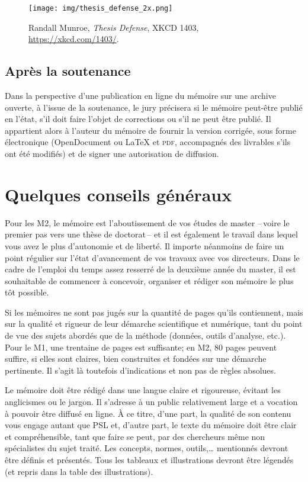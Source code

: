 \documentclass[a4paper,twoside,12pt]{book}
\begin{document}
\begin{figure}
\centering %
\texttt{[image: img/thesis\_defense\_2x.png]}
\caption{Randall Munroe, \textit{Thesis Defense}, XKCD 1403, \url{https://xkcd.com/1403/}.}
\end{figure}


\subsection{Après la soutenance}

Dans la perspective d'une publication en ligne du mémoire sur une archive ouverte, à l'issue de la soutenance, le jury précisera si le mémoire peut-être publié en l'état, s'il doit faire l'objet de corrections ou s'il ne peut être publié. Il appartient alors à l'auteur du mémoire 
de fournir la version corrigée, sous forme électronique (OpenDocument ou \LaTeX{} et \textsc{pdf}, accompagnés des livrables s'ils ont été modifiés) et de signer une autorisation de diffusion.

\section{Quelques conseils généraux}

Pour les M2, le mémoire est l'aboutissement de vos études de master --\,voire le premier pas vers une thèse de doctorat\,-- et il est également le travail dans lequel vous avez le plus d'autonomie et de liberté. 
Il importe néanmoins de faire un point régulier sur l'état d'avancement de vos travaux avec vos directeurs. Dans le cadre de l'emploi du temps assez resserré de la deuxième année du master, il est souhaitable
de commencer à concevoir, organiser et rédiger son mémoire le plus tôt possible.


Si les mémoires ne sont pas jugés sur la quantité de pages qu'ils contiennent, mais sur la qualité et rigueur de leur démarche scientifique et numérique, tant du point de vue des sujets abordés que de la méthode (données, outils d'analyse, etc.). Pour le M1, une trentaine de pages est suffisante; en M2, 80 pages peuvent suffire, si elles sont claires, bien construites et fondées sur une démarche pertinente.
Il s'agit là toutefois d'indications et non pas de règles absolues.

Le mémoire doit être rédigé dans une langue claire et rigoureuse, évitant les anglicismes ou le jargon. Il s'adresse à un public relativement large et a vocation à pouvoir être diffusé en ligne. À ce titre, d'une part, la qualité de son contenu vous engage autant que PSL et, d'autre part,  
le texte du mémoire doit être clair et compréhensible, tant que faire se peut, par des chercheurs même non spécialistes du sujet traité. 
Les concepts, normes, outils,\dots{} mentionnés devront être définis et présentés.
Tous les tableaux et illustrations devront être légendés (et repris dans la table des illustrations).
\end{document}
